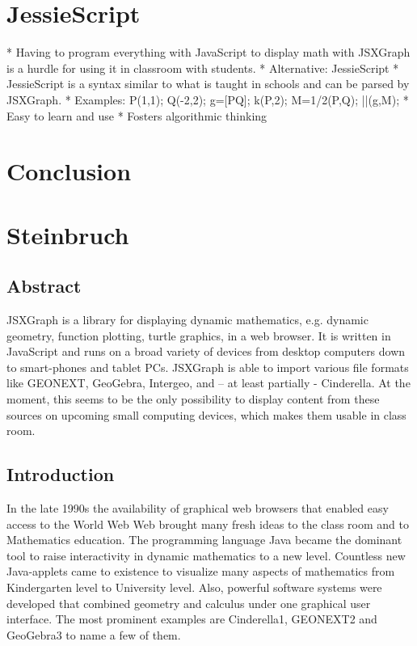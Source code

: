 \documentclass[12pt,a4paper]{article}%
\begin{document}
\section{JessieScript}
    * Having to program everything with JavaScript to display math with JSXGraph is a hurdle for using it in classroom with students.
    * Alternative: JessieScript
    * JessieScript is a syntax similar to what is taught in schools and can be parsed by JSXGraph.
    * Examples: P(1,1); Q(-2,2); g=[PQ]; k(P,2); M=1/2(P,Q); ||(g,M);
    * Easy to learn and use
    * Fosters algorithmic thinking 




\section{Conclusion}


\section{Steinbruch}

\subsection{Abstract}
JSXGraph is a library for displaying dynamic mathematics, e.g. dynamic geometry, function plotting, turtle graphics, in a web browser. It is written in JavaScript and runs on a broad variety of devices from desktop computers down to smart-phones and tablet PCs. JSXGraph is able to import various file formats like GEONEXT, GeoGebra, Intergeo, and – at least partially - Cinderella. At the moment, this seems to be the only possibility to display content from these sources on upcoming small computing devices, which makes them usable in class room.

\subsection{Introduction}
In the late 1990s the availability of graphical web browsers that enabled easy access to the World Web Web brought many fresh ideas to the class room and to Mathematics education. The programming language Java became the dominant tool to raise interactivity in dynamic mathematics to a new level. Countless new Java-applets came to existence to visualize many aspects of mathematics from Kindergarten level to University level. Also, powerful software systems were developed that combined geometry and calculus under one graphical user interface. The most prominent examples are Cinderella1, GEONEXT2 and GeoGebra3 to name a few of them.
\end{document}
